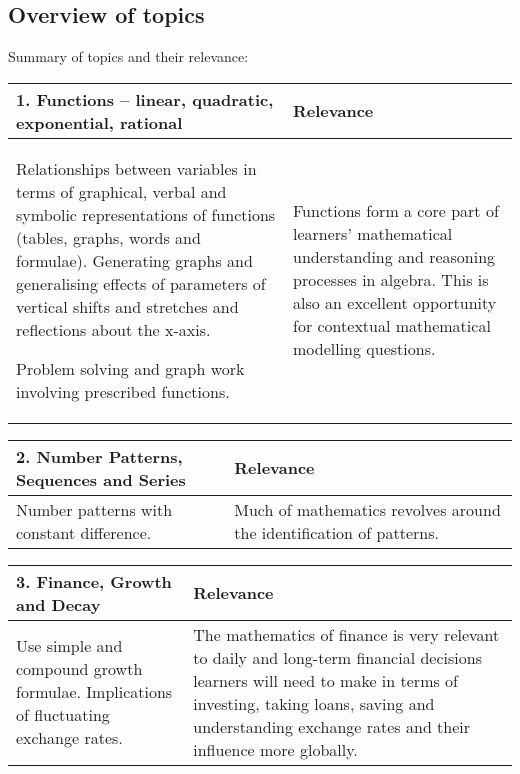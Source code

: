 \subsection{Overview of topics}
Summary of topics and their relevance:

\begin{table}[H]
\begin{center} 
\begin{tabular}{|p{8.5cm}|p{3.5cm}|} \hline
\textbf{1. Functions – linear, quadratic, exponential, rational} &\textbf{Relevance}  \\ \hline  

Relationships between variables in terms of graphical, verbal and symbolic representations of functions (tables, graphs, words and formulae). Generating graphs and generalising effects of parameters of vertical shifts and stretches and reflections about the x-axis.\par
Problem solving and graph work involving prescribed functions.& Functions form a core part of learners’ mathematical understanding and reasoning processes in algebra. This is also an excellent opportunity for contextual mathematical modelling questions. \\ \hline

 \end{tabular}
\end{center}
\end{table}

\begin{table}[H]
\begin{center} 
\begin{tabular}{|p{8.5cm}|p{3.5cm}|} \hline
\textbf{2. Number Patterns, Sequences and Series}&\textbf{Relevance} \\ \hline  

Number patterns with constant difference.& Much of mathematics revolves around the identification of patterns.
\\ \hline

 \end{tabular}
\end{center}
\end{table}

\begin{table}[H]
\begin{center} 
\begin{tabular}{|p{8.5cm}|p{3.5cm}|} \hline
\textbf{3. Finance, Growth and Decay}& \textbf{Relevance} \\ \hline  

Use simple and compound growth formulae. Implications of fluctuating exchange rates.& The mathematics of finance is very relevant to daily and long-term financial decisions learners will need to make in terms of investing, taking loans, saving and understanding exchange rates and their influence more globally.
\\ \hline

 \end{tabular}
\end{center}
\end{table}

